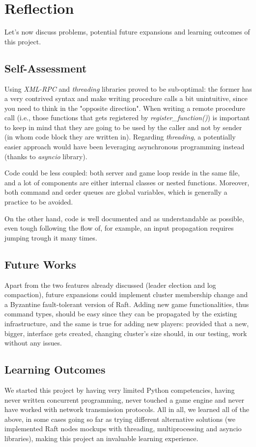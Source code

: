 \section{Reflection}

Let's now discuss problems, potential future expansions and learning outcomes of this project.

\subsection{Self-Assessment}

Using \textit{XML-RPC} and \textit{threading} libraries proved to be sub-optimal: the former has a very contrived syntax and make writing procedure calls a bit unintuitive, since you need to think in the "opposite direction". When writing a remote procedure call (i.e., those functions that gets registered by \textit{register\_function()}) is important to keep in mind that they are going to be used by the caller and not by sender (in whom code block they are written in). Regarding \textit{threading}, a potentially easier approach would have been leveraging asynchronous programming instead (thanks to \textit{asyncio} library).

Code could be less coupled: both server and game loop reside in the same file, and a lot of components are either internal classes or nested functions. Moreover, both command and order queues are global variables, which is generally a practice to be avoided.  

On the other hand, code is well documented and as understandable as possible, even tough following the flow of, for example, an input propagation requires jumping trough it many times.

\subsection{Future Works}

Apart from the two features already discussed (leader election and log compaction), future expansions could implement cluster membership change and a Byzantine fault-tolerant version of Raft. Adding new game functionalities, thus command types, should be easy since they can be propagated by the existing infrastructure, and the same is true for adding new players: provided that a new, bigger, interface gets created, changing cluster's size should, in our testing, work without any issues.  

\subsection{Learning Outcomes}

We started this project by having very limited Python competencies, having never written concurrent programming, never touched a game engine and never have worked with network transmission protocols. All in all, we learned all of the above, in some cases going so far as trying different alternative solutions (we implemented Raft nodes mockups with threading, multiprocessing and asyncio libraries), making this project an invaluable learning experience. 